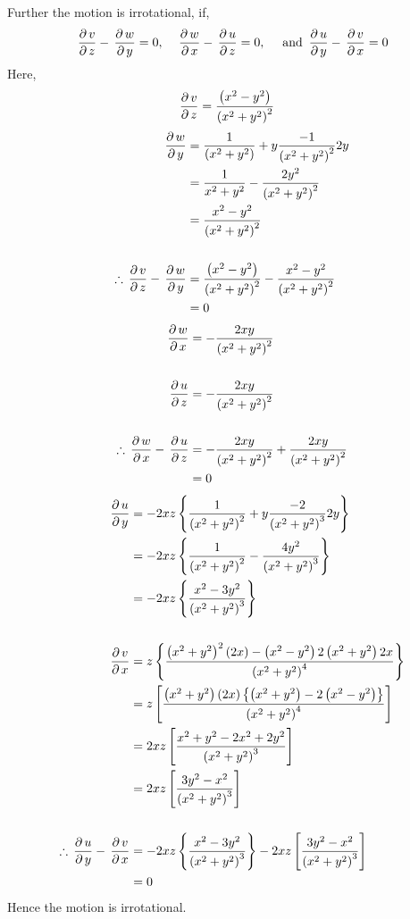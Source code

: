 \documentclass[12pt]{article}
\begin{document}
\begin{soln}
    Further the motion is irrotational, if,
    \[
        \,\frac{\partial\, v}{\partial\, z}-\,\frac{\partial\, w}{\partial\, y}=0,\quad\,\frac{\partial\, w}{\partial\, x}-\,\frac{\partial\, u}{\partial\, z}=0,\quad\text{ and }\,\frac{\partial\, u}{\partial\, y}-\,\frac{\partial\, v}{\partial\, x}=0
    \]
    Here,
    \begin{align*}
        \,\frac{\partial\, v}{\partial\, z}&=\frac{\left( x^2-y^2 \right)}{\left( x^2+y^2 \right)^2}
    \end{align*}
    \begin{align*}
        \,\frac{\partial\, w}{\partial\, y}&=\frac{1}{\left( x^2+y^2 \right)}+y\frac{-1}{\left( x^2+y^2 \right)^2}2y\\
        &=\frac{1}{x^2+y^2}-\frac{2y^2}{\left( x^2+y^2 \right)^2}\\
        &=\frac{x^2-y^2}{\left( x^2+y^2 \right)^2}\\
        &\\ 
        \therefore \,\frac{\partial\, v}{\partial\, z}-\,\frac{\partial\, w}{\partial\, y}&=\frac{\left( x^2-y^2 \right)}{\left( x^2+y^2 \right)^2}-\frac{x^2-y^2}{\left( x^2+y^2 \right)^2}\\
        &=0
    \end{align*}
    \begin{align*}
        \,\frac{\partial\, w}{\partial\, x}&=-\frac{2xy}{\left( x^2+y^2 \right)^2}\\
        &\\
        \,\frac{\partial\, u}{\partial\, z}&=-\frac{2xy}{\left( x^2+y^2 \right)^2}\\
        &\\
        \therefore \,\frac{\partial\, w}{\partial\, x}-\,\frac{\partial\, u}{\partial\, z}&=-\frac{2xy}{\left( x^2+y^2 \right)^2}+\frac{2xy}{\left( x^2+y^2 \right)^2}\\
        &=0
    \end{align*}
    \begin{align*}
        \,\frac{\partial\, u}{\partial\, y}&=-2xz\left\{ \frac{1}{\left( x^2+y^2 \right)^2}+y\frac{-2}{\left( x^2+y^2 \right)^3}2y \right\}\\
        &=-2xz\left\{ \frac{1}{\left( x^2+y^2 \right)^2}-\frac{4y^2}{\left( x^2+y^2 \right)^3} \right\}\\
        &=-2xz\left\{ \frac{x^2-3y^2}{\left( x^2+y^2 \right)^3} \right\}\\
        &\\
        \,\frac{\partial\, v}{\partial\, x}&=z\left\{ \frac{\left( x^2+y^2 \right)^2(2x)-\left( x^2-y^2 \right)2\left( x^2+y^2 \right)2x}{\left( x^2+y^2 \right)^4} \right\}\\
        &=z\left[ \frac{\left( x^2+y^2 \right)(2x)\left\{\left( x^2+y^2 \right)-2\left( x^2-y^2 \right)\right\}}{\left( x^2+y^2 \right)^4} \right]\\
        &=2xz\left[ \frac{x^2+y^2-2x^2+2y^2 }{\left( x^2+y^2 \right)^3} \right]\\
        &=2xz\left[ \frac{3y^2-x^2}{\left( x^2+y^2 \right)^3} \right]\\
        &\\
        \therefore \,\frac{\partial\, u}{\partial\, y}-\,\frac{\partial\, v}{\partial\, x}&=-2xz\left\{ \frac{x^2-3y^2}{\left( x^2+y^2 \right)^3} \right\}-2xz\left[ \frac{3y^2-x^2}{\left( x^2+y^2 \right)^3} \right]\\
        &=0
    \end{align*}
    Hence the motion is irrotational.
\end{soln}
\end{document}
